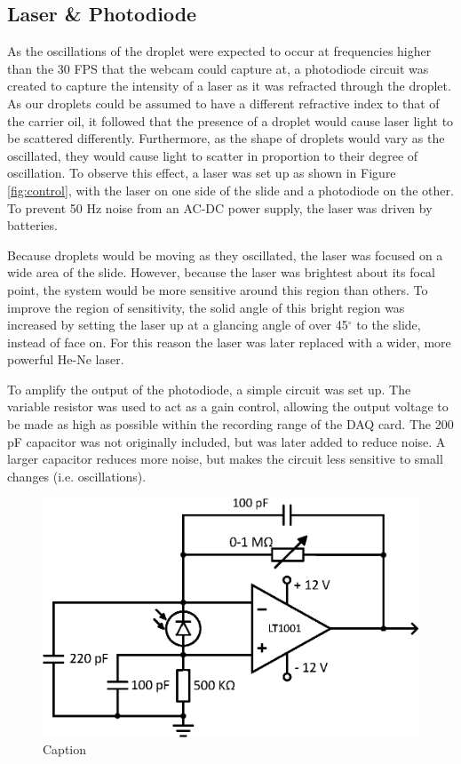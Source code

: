 \documentclass{physics_article_B}
\begin{document}
    \subsection{Laser \& Photodiode\label{sect:method:laser}}
    
        As the oscillations of the droplet were expected to occur at frequencies higher than the 30 FPS that the webcam could capture at, a photodiode circuit was created to capture the intensity of a laser as it was refracted through the droplet. As our droplets could be assumed to have a different refractive index to that of the carrier oil\cite{viscosity1,viscosity2}, it followed that the presence of a droplet would cause laser light to be scattered differently. Furthermore, as the shape of droplets would vary as the oscillated, they would cause light to scatter in proportion to their degree of oscillation. To observe this effect, a laser was set up as shown in Figure \ref{fig:control}, with the laser on one side of the slide and a photodiode on the other. To prevent 50 Hz noise from an AC-DC power supply, the laser was driven by batteries.
        
        Because droplets would be moving as they oscillated, the laser was focused on a wide area of the slide. However, because the laser was brightest about its focal point, the system would be more sensitive around this region than others. To improve the region of sensitivity, the solid angle of this bright region was increased by setting the laser up at a glancing angle of over 45$^{\circ}$ to the slide, instead of face on. For this reason the laser was later replaced with a wider, more powerful He-Ne laser.
        
        To amplify the output of the photodiode, a simple circuit was set up\cite{artofelectronics}. The variable resistor was used to act as a gain control, allowing the output voltage to be made as high as possible within the recording range of the DAQ card. The 200 pF capacitor was not originally included, but was later added to reduce noise. A larger capacitor reduces more noise, but makes the circuit less sensitive to small changes (i.e. oscillations).
    
        \begin{figure}[H]
            \centering
            \includegraphics[scale=0.8]{Figures/PDCircuit.eps}
            \caption{Caption}
            \label{fig:my_label}
        \end{figure}
    
\end{document}
